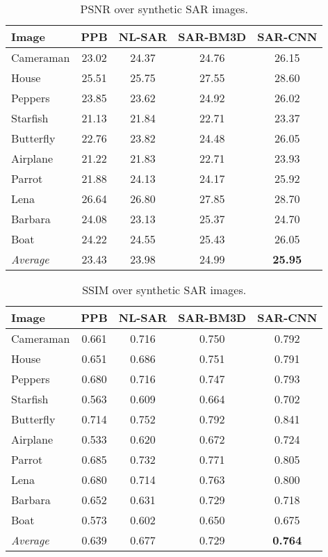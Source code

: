 \documentclass{article}
\begin{document}
\begin{table}[t]
	\centering
	\caption{PSNR over synthetic SAR images.}
	\label{tab:PSNR}
	\footnotesize
	\begin{tabular}{lcccc}
		\toprule
		Image     &  PPB   & NL-SAR & SAR-BM3D & SAR-CNN \\ \midrule
		Cameraman &  23.02 &  24.37 &    24.76 &   26.15 \\
		House     &  25.51 &  25.75 &    27.55 &   28.60 \\
		Peppers   &  23.85 &  23.62 &    24.92 &   26.02 \\
		Starfish  &  21.13 &  21.84 &    22.71 &   23.37 \\
		Butterfly &  22.76 &  23.82 &    24.48 &   26.05 \\
		Airplane  &  21.22 &  21.83 &    22.71 &   23.93 \\
		Parrot    &  21.88 &  24.13 &    24.17 &   25.92 \\
		Lena      &  26.64 &  26.80 &    27.85 &   28.70 \\
		Barbara   &  24.08 &  23.13 &    25.37 &   24.70 \\
		Boat      &  24.22 &  24.55 &    25.43 &   26.05 \\ \midrule
\textsl{Average}  &  23.43 &  23.98 &    24.99 &   \textbf{25.95} \\
		\bottomrule
	\end{tabular}
\end{table}

\begin{table}[t]
	\centering
	\caption{SSIM over synthetic SAR images.}
	\label{tab:SSIM}
	\footnotesize
	\begin{tabular}{lcccc}
		\toprule
		Image     &    PPB & NL-SAR & SAR-BM3D & SAR-CNN \\ \midrule
		Cameraman &  0.661 &  0.716 &    0.750 &   0.792 \\
		House     &  0.651 &  0.686 &    0.751 &   0.791 \\
		Peppers   &  0.680 &  0.716 &    0.747 &   0.793 \\
		Starfish  &  0.563 &  0.609 &    0.664 &   0.702 \\
		Butterfly &  0.714 &  0.752 &    0.792 &   0.841 \\
		Airplane  &  0.533 &  0.620 &    0.672 &   0.724 \\
		Parrot    &  0.685 &  0.732 &    0.771 &   0.805 \\
		Lena      &  0.680 &  0.714 &    0.763 &   0.800 \\
		Barbara   &  0.652 &  0.631 &    0.729 &   0.718 \\
		Boat      &  0.573 &  0.602 &    0.650 &   0.675 \\ \midrule
\textsl{Average}  &  0.639 &  0.677 &    0.729 &   \textbf{0.764} \\
		\bottomrule
	\end{tabular}
\end{table}
\end{document}
